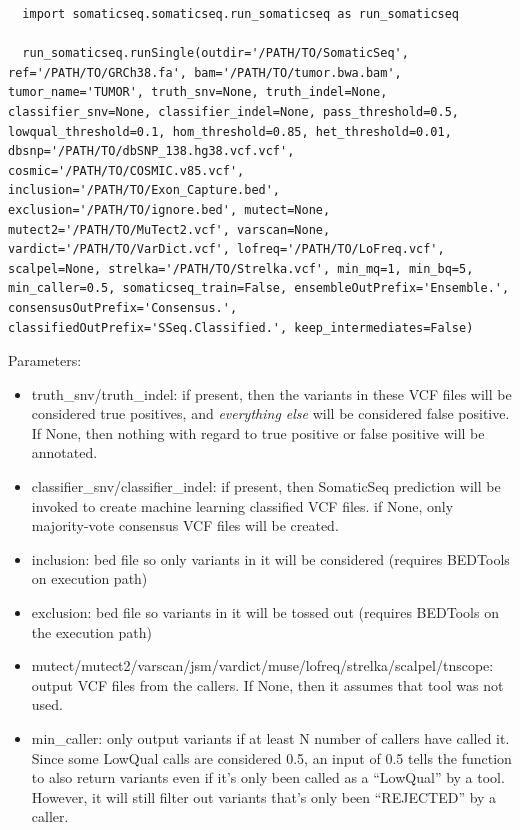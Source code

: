 \documentclass[10pt,letterpaper]{article}
\begin{document}
\begin{sloppypar}
\begin{lstlisting}
  import somaticseq.somaticseq.run_somaticseq as run_somaticseq
  
  run_somaticseq.runSingle(outdir='/PATH/TO/SomaticSeq', ref='/PATH/TO/GRCh38.fa', bam='/PATH/TO/tumor.bwa.bam', tumor_name='TUMOR', truth_snv=None, truth_indel=None, classifier_snv=None, classifier_indel=None, pass_threshold=0.5, lowqual_threshold=0.1, hom_threshold=0.85, het_threshold=0.01, dbsnp='/PATH/TO/dbSNP_138.hg38.vcf.vcf', cosmic='/PATH/TO/COSMIC.v85.vcf', inclusion='/PATH/TO/Exon_Capture.bed', exclusion='/PATH/TO/ignore.bed', mutect=None, mutect2='/PATH/TO/MuTect2.vcf', varscan=None, vardict='/PATH/TO/VarDict.vcf', lofreq='/PATH/TO/LoFreq.vcf', scalpel=None, strelka='/PATH/TO/Strelka.vcf', min_mq=1, min_bq=5, min_caller=0.5, somaticseq_train=False, ensembleOutPrefix='Ensemble.', consensusOutPrefix='Consensus.', classifiedOutPrefix='SSeq.Classified.', keep_intermediates=False)
\end{lstlisting}


Parameters:

\begin{itemize}

\item truth\_snv/truth\_indel: if present, then the variants in these VCF files will be considered true positives, and \emph{everything else} will be considered false positive. If None, then nothing with regard to true positive or false positive will be annotated. 

\item classifier\_snv/classifier\_indel: if present, then SomaticSeq prediction will be invoked to create machine learning classified VCF files. if None, only majority-vote consensus VCF files will be created. 

\item inclusion: bed file so only variants in it will be considered (requires BEDTools on execution path)

\item exclusion: bed file so variants in it will be tossed out (requires BEDTools on the execution path)

\item mutect/mutect2/varscan/jsm/vardict/muse/lofreq/strelka/scalpel/tnscope: output VCF files from the callers. If None, then it assumes that tool was not used. 

\item min\_caller: only output variants if at least N number of callers have called it. Since some LowQual calls are considered 0.5, an input of 0.5 tells the function to also return variants even if it's only been called as a ``LowQual'' by a tool. However, it will still filter out variants that's only been ``REJECTED'' by a caller.


\end{itemize}
\end{sloppypar}
\end{document}
